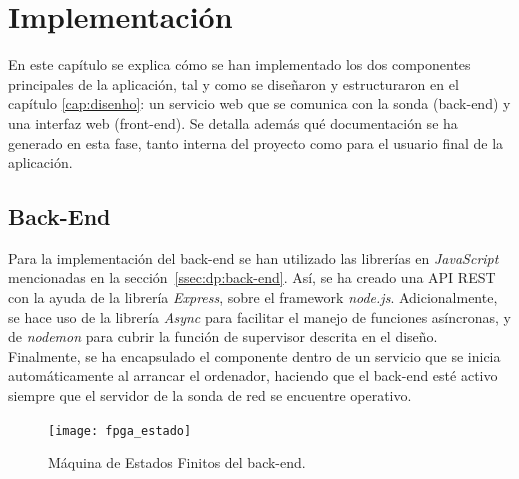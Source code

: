 \chapter{Implementación\label{cap:implementacion}}

En este capítulo se explica cómo se han implementado los dos componentes principales de la aplicación, tal y como se diseñaron y estructuraron en el capítulo \ref{cap:disenho}: un servicio web que se comunica con la sonda (\gls{back-end}) y una interfaz web (\gls{front-end}).
Se detalla además qué documentación se ha generado en esta fase, tanto interna del proyecto como para el usuario final de la aplicación.

\section{Back-End\label{sec:imp:back_end}}

Para la implementación del \gls{back-end} se han utilizado las librerías en \textit{JavaScript} mencionadas en la sección~\ref{ssec:dp:back-end}.
Así, se ha creado una \gls{API} \gls{REST} con la ayuda de la librería \textit{Express}, sobre el \gls{framework} \textit{node.js}.
Adicionalmente, se hace uso de la librería \textit{Async} para facilitar el manejo de funciones asíncronas, y de \textit{nodemon} para cubrir la función de supervisor descrita en el diseño.
Finalmente, se ha encapsulado el componente dentro de un servicio que se inicia automáticamente al arrancar el ordenador, haciendo que el \gls{back-end} esté activo siempre que el servidor de la sonda de red se encuentre operativo.

\begin{figure}[!htp]
  \centering
  \texttt{[image: fpga\_estado]}
  \caption{Máquina de Estados Finitos del \gls{back-end}.}
  \label{fig:fpga_estado}
\end{figure}

